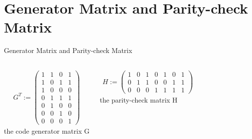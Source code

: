 \documentclass[10pt]{beamer}
\begin{document}
\section{Generator Matrix and Parity-check Matrix}
\begin{frame}{Generator Matrix and Parity-check Matrix}
    \begin{columns}
            \begin{align*}
                G^T := 
                \begin{pmatrix}
                1&1&0&1\\
                1&0&1&1\\
                1&0&0&0\\
                0&1&1&1\\
                0&1&0&0\\
                0&0&1&0\\
                0&0&0&1
                \end{pmatrix}
            \end{align*}
            the code generator matrix G
            
            \begin{align*}
                H := 
                \begin{pmatrix}
                1&0&1&0&1&0&1\\
                0&1&1&0&0&1&1\\
                0&0&0&1&1&1&1
                \end{pmatrix}
            \end{align*}
            the parity-check matrix H
    \end{columns}
\end{frame}

\end{document}
